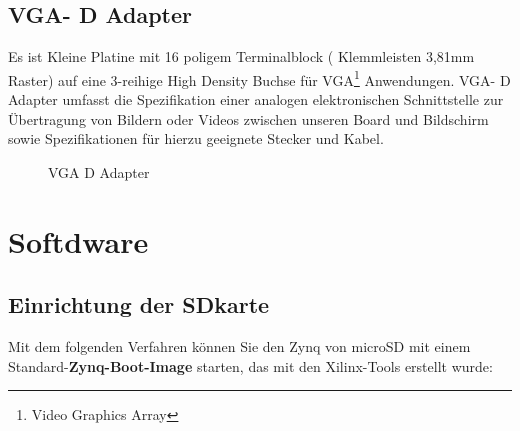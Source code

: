 \documentclass[a4paper]{report}
\begin{document}
\section{VGA- D Adapter}
Es ist Kleine Platine mit 16 poligem Terminalblock ( Klemmleisten 3,81mm Raster) auf eine 3-reihige High Density Buchse für VGA\footnote{Video Graphics Array} Anwendungen.
VGA- D Adapter umfasst die Spezifikation einer analogen elektronischen Schnittstelle zur Übertragung von Bildern oder Videos zwischen unseren Board und Bildschirm sowie Spezifikationen für hierzu geeignete Stecker und Kabel.


		\begin{figure}[H]
			\centering
			\qquad
			\caption{VGA D Adapter}
			\label{fig:VGA_Adapter}
		\end{figure}





\chapter{Softdware}

	
\section{Einrichtung der SDkarte}
\label{Einrichtung_der_SDkarte}


Mit dem folgenden Verfahren können Sie den Zynq von microSD mit einem Standard-\textbf{Zynq-Boot-Image} starten, das mit den Xilinx-Tools erstellt wurde:
\end{document}
